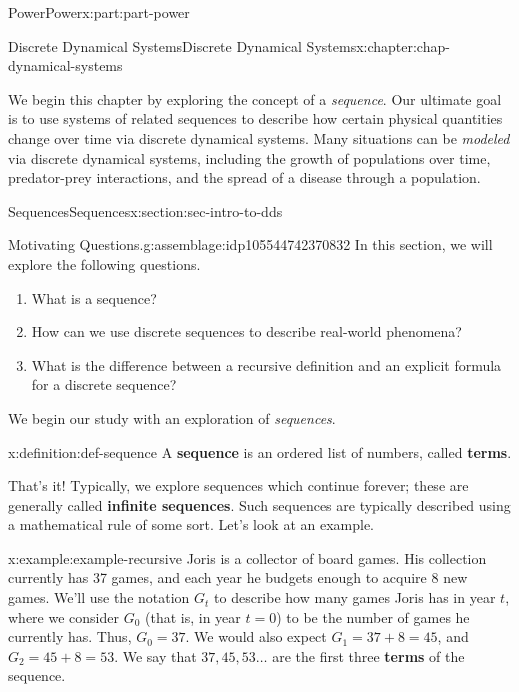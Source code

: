 \documentclass[oneside,10pt,]{book}
\newcommand{\terminology}[1]{\textbf{#1}}
\numberwithin{equation}{section}
\begin{document}
\begin{partptx}{Power}{}{Power}{}{}{x:part:part-power}
%
\begin{chapterptx}{Discrete Dynamical Systems}{}{Discrete Dynamical Systems}{}{}{x:chapter:chap-dynamical-systems}
\begin{introduction}{}%
We begin this chapter by exploring the concept of a \emph{sequence}. Our ultimate goal is to use systems of related sequences to describe how certain physical quantities change over time via discrete dynamical systems. Many situations can be \emph{modeled} via discrete dynamical systems, including the growth of populations over time, predator-prey interactions, and the spread of a disease through a population.%
\end{introduction}%
%
%
\typeout{************************************************}
\typeout{************************************************}
%
\begin{sectionptx}{Sequences}{}{Sequences}{}{}{x:section:sec-intro-to-dds}
\begin{assemblage}{Motivating Questions.}{g:assemblage:idp105544742370832}%
In this section, we will explore the following questions. %
\begin{enumerate}
\item{}What is a sequence?%
\item{}How can we use discrete sequences to describe real-world phenomena?%
\item{}What is the difference between a recursive definition and an explicit formula for a discrete sequence?%
\end{enumerate}
%
\end{assemblage}
We begin our study with an exploration of \emph{sequences}.%
\begin{definition}{}{x:definition:def-sequence}%
%
%
A \terminology{sequence} is an ordered list of numbers, called \terminology{terms}.%
\end{definition}
That's it! Typically, we explore sequences which continue forever; these are generally called \terminology{infinite sequences}. Such sequences are typically described using a mathematical rule of some sort. Let's look at an example.%
\begin{example}{}{x:example:example-recursive}%
Joris is a collector of board games. His collection currently has 37 games, and each year he budgets enough to acquire 8 new games. We'll use the notation \(G_t\) to describe how many games Joris has in year \(t\), where we consider \(G_0\) (that is, in year \(t=0\)) to be the number of games he currently has. Thus, \(G_0 = 37\). We would also expect \(G_1 = 37 + 8 = 45\), and \(G_2 = 45 + 8 = 53\). We say that \(37, 45, 53\ldots\) are the first three \terminology{terms} of the sequence.%

\end{example}
\end{sectionptx}
\end{chapterptx}
\end{partptx}
\end{document}
